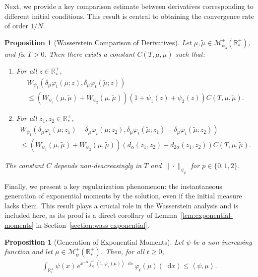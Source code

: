 \documentclass[11pt,a4paper]{article}
\newcommand{\RRP}{\mathbb{R}^+_*}
\newcommand{\MC}{\mathcal{M}}
\newcommand{\brac}[1]{\left\langle#1\right\rangle}
\newcommand{\dd}{\mathop{}\!\mathrm{d}}
\newtheorem{proposition}[theorem]{Proposition}
\begin{document}
Next, we provide a key comparison estimate between derivatives corresponding to different initial conditions. This result is central to obtaining the convergence rate of order $1/N$.

\begin{proposition}[Wasserstein Comparison of Derivatives]\label{prop:wass-final}
    Let $\mu, \tilde{\mu} \in \MC_{\psi_3}^+(\RRP)$, and fix $T > 0$. Then there exists a constant $C(T,\mu,\tilde{\mu})$ such that:
    \begin{enumerate}
        \item For all $z \in \RRP$,
        \begin{multline*}
        W_{\psi_1}\left( \delta_\mu \varphi_t(\mu; z), \delta_\mu \varphi_t(\tilde{\mu}; z)\right)  \\
        \leq \left(W_{\psi_1}(\mu,\tilde{\mu}) + W_{\psi_2}(\mu,\tilde{\mu})\right)(1 + \psi_1(z)+ \psi_2(z)) C(T,\mu,\tilde{\mu}).
        \end{multline*}
        \item For all $z_1,z_2 \in \RRP$,
        \begin{multline*}
            W_{\psi_1}\left( \delta_\mu \varphi_t(\mu; z_1) - \delta_\mu \varphi_t(\mu; z_2), \delta_\mu \varphi_t(\tilde{\mu}; z_1)-\delta_\mu \varphi_t(\tilde{\mu}; z_2)\right) \\
             \leq \left(W_{\psi_1}(\mu,\tilde{\mu}) + W_{\psi_2}(\mu,\tilde{\mu})\right)\left(d_\alpha(z_1,z_2) + d_{2\alpha}(z_1,z_2)\right) C(T,\mu,\tilde{\mu}).
        \end{multline*}
    \end{enumerate}
    The constant $C$ depends non-deacreasingly in $T$ and $\|\cdot \|_{\psi_p}$ for $p \in \lbrace 0,1,2 \rbrace$.
\end{proposition}

Finally, we present a key regularization phenomenon: the instantaneous generation of exponential moments by the solution, even if the initial measure lacks them. This result plays a crucial role in the Wasserstein analysis and is included here, as its proof is a direct corollary of Lemma~\ref{lem:exponential-moments} in Section~\ref{section:wass-exponential}.

\begin{proposition}[Generation of Exponential Moments]\label{prop:exponential-moments}
    Let $\psi$ be a non-increasing function and let $\mu \in \MC^+_{\psi}(\RRP)$. Then, for all $t \geq 0$,
    \begin{align*}
        \int_{\RRP} \psi(x)\, e^{x^{-\alpha}\int_0^t \brac{1,\varphi_s(\mu)}\dd s}\, \varphi_t(\mu)(\dd x) \leq \brac{\psi,\mu}.
    \end{align*}
\end{proposition}
\end{document}
